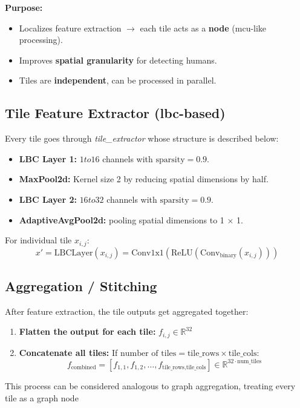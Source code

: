\textbf{Purpose:}
\begin{itemize}
    \item Localizes feature extraction $\rightarrow$ each tile acts as a \textbf{node} (\gls{mcu}-like processing).
    \item Improves \textbf{spatial granularity} for detecting humans.
    \item Tiles are \textbf{independent}, can be processed in parallel.
\end{itemize}

\subsection*{Tile Feature Extractor (\gls{lbc}-based)}
Every tile goes through \textit{tile\_extractor} whose structure is described below:
\begin{itemize}
    \item \textbf{LBC Layer 1:} $1  to 16$ channels with $\text{sparsity}=0.9$.
    \item \textbf{MaxPool2d:} Kernel size 2 by reducing spatial dimensions by half.
    \item \textbf{LBC Layer 2:} $16  to 32$ channels with $\text{sparsity}=0.9$.
    \item \textbf{AdaptiveAvgPool2d:} pooling spatial dimensions to 1 × 1.
\end{itemize}

For individual tile $x_{i,j}$:
\begin{equation}
x' = \text{LBCLayer}(x_{i,j}) = \text{Conv1x1}(\text{ReLU}(\text{Conv}_{\text{binary}}(x_{i,j})))
\end{equation}

\subsection*{Aggregation / Stitching}
After feature extraction, the tile outputs get aggregated together:
\begin{enumerate}
    \item \textbf{Flatten the output for each tile:} $f_{i,j} \in \mathbb{R}^{32}$
    \item \textbf{Concatenate all tiles:} 
    If $\text{number of tiles} = \text{tile\_rows} \times \text{tile\_cols}$:
    \begin{equation}
    f_{\text{combined}} = [f_{1,1}, f_{1,2}, \dots, f_{\text{tile\_rows,tile\_cols}}] \in \mathbb{R}^{32 \cdot \text{num\_tiles}}
    \end{equation}
\end{enumerate}
This process can be considered analogous to graph aggregation, treating every tile as a graph node
